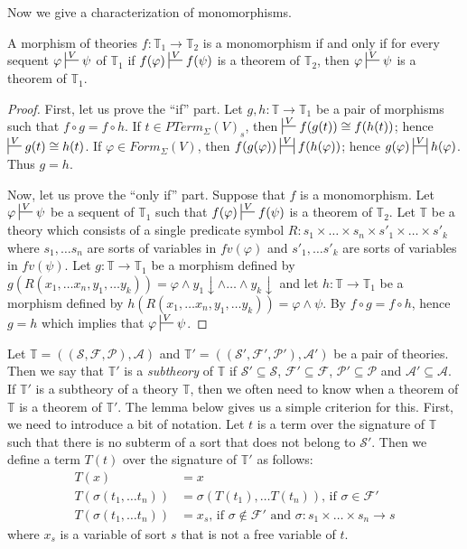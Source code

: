 \documentclass[reqno]{amsart}
\theoremstyle{definition}
\theoremstyle{remark}
\numberwithin{figure}{section}
\begin{document}
Now we give a characterization of monomorphisms.

\begin{prop}
A morphism of theories $f : \mathbb{T}_1 \to \mathbb{T}_2$ is a monomorphism if and only if for every sequent $\varphi \sststile{}{V} \psi$ of $\mathbb{T}_1$
if $f(\varphi) \sststile{}{V} f(\psi)$ is a theorem of $\mathbb{T}_2$, then $\varphi \sststile{}{V} \psi$ is a theorem of $\mathbb{T}_1$.
\end{prop}
\begin{proof}
First, let us prove the ``if'' part.
Let $g,h : \mathbb{T} \to \mathbb{T}_1$ be a pair of morphisms such that $f \circ g = f \circ h$.
If $t \in PTerm_\Sigma(V)_s$, then $\sststile{}{V} f(g(t)) \cong f(h(t))$; hence $\sststile{}{V} g(t) \cong h(t)$.
If $\varphi \in Form_\Sigma(V)$, then $f(g(\varphi)) \ssststile{}{V} f(h(\varphi))$; hence $g(\varphi) \ssststile{}{V} h(\varphi)$.
Thus $g = h$.

Now, let us prove the ``only if'' part.
Suppose that $f$ is a monomorphism.
Let $\varphi \sststile{}{V} \psi$ be a sequent of $\mathbb{T}_1$ such that $f(\varphi) \sststile{}{V} f(\psi)$ is a theorem of $\mathbb{T}_2$.
Let $\mathbb{T}$ be a theory which consists of a single predicate symbol $R : s_1 \times \ldots \times s_n \times s'_1 \times \ldots \times s'_k$
where $s_1, \ldots s_n$ are sorts of variables in $fv(\varphi)$ and $s'_1, \ldots s'_k$ are sorts of variables in $fv(\psi)$.
Let $g : \mathbb{T} \to \mathbb{T}_1$ be a morphism defined by $g(R(x_1, \ldots x_n, y_1, \ldots y_k)) = \varphi \land y_1\!\downarrow \land \ldots \land y_k\!\downarrow$ and
let $h : \mathbb{T} \to \mathbb{T}_1$ be a morphism defined by $h(R(x_1, \ldots x_n, y_1, \ldots y_k)) = \varphi \land \psi$.
By  $f \circ g = f \circ h$, hence $g = h$ which implies that $\varphi \sststile{}{V} \psi$.
\end{proof}

Let $\mathbb{T} = ((\mathcal{S},\mathcal{F},\mathcal{P}),\mathcal{A})$ and $\mathbb{T}' = ((\mathcal{S}',\mathcal{F}',\mathcal{P}'),\mathcal{A}')$ be a pair of theories.
Then we say that $\mathbb{T}'$ is a \emph{subtheory} of $\mathbb{T}$ if $\mathcal{S}' \subseteq \mathcal{S}$, $\mathcal{F}' \subseteq \mathcal{F}$, $\mathcal{P}' \subseteq \mathcal{P}$ and $\mathcal{A}' \subseteq \mathcal{A}$.
If $\mathbb{T}'$ is a subtheory of a theory $\mathbb{T}$, then we often need to know when a theorem of $\mathbb{T}$ is a theorem of $\mathbb{T}'$.
The lemma below gives us a simple criterion for this.
First, we need to introduce a bit of notation.
Let $t$ is a term over the signature of $\mathbb{T}$ such that there is no subterm of a sort that does not belong to $\mathcal{S}'$.
Then we define a term $T(t)$ over the signature of $\mathbb{T}'$ as follows:
\begin{align*}
T(x) & = x \\
T(\sigma(t_1, \ldots t_n)) & = \sigma(T(t_1), \ldots T(t_n)) \text{, if $\sigma \in \mathcal{F}'$} \\
T(\sigma(t_1, \ldots t_n)) & = x_s \text{, if $\sigma \notin \mathcal{F}'$ and $\sigma : s_1 \times \ldots \times s_n \to s$}
\end{align*}
where $x_s$ is a variable of sort $s$ that is not a free variable of $t$.
\end{document}

